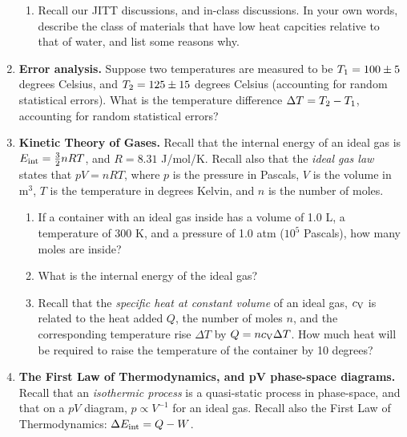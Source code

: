\documentclass[10pt]{article}
\begin{document}
\begin{enumerate}
\begin{enumerate}
\item Recall our JITT discussions, and in-class discussions.  In your own words, describe the class of materials that have low heat capcities relative to that of water, and list some reasons why. \\ \vspace{3cm}
\end{enumerate}
\item \textbf{Error analysis.}  Suppose two temperatures are measured to be $T_{\rm 1} = 100 \pm 5$ degrees Celsius, and $T_{\rm 2} = 125 \pm 15$ degrees Celsius (accounting for random statistical errors).  What is the temperature difference $\Delta T = T_{\rm 2} - T_{\rm 1}$, accounting for random statistical errors? \\ \vspace{2cm}
\item \textbf{Kinetic Theory of Gases.} Recall that the internal energy of an ideal gas is $E_{\rm int} = \frac{3}{2}n R T$, and $R = 8.31$ J/mol/K.  Recall also that the \textit{ideal gas law} states that $pV = n R T$, where $p$ is the pressure in Pascals, $V$ is the volume in m$^3$, $T$ is the temperature in degrees Kelvin, and $n$ is the number of moles.
\begin{enumerate}
\item If a container with an ideal gas inside has a volume of 1.0 L, a temperature of 300 K, and a pressure of 1.0 atm ($10^5$ Pascals), how many moles are inside? \\ \vspace{2cm}
\item What is the internal energy of the ideal gas? \\ \vspace{2cm}
\item Recall that the \textit{specific heat at constant volume} of an ideal gas, $c_{\rm V}$ is related to the heat added $Q$, the number of moles $n$, and the corresponding temperature rise $\Delta T$ by $Q = n c_{\rm V} \Delta T$.  How much heat will be required to raise the temperature of the container by 10 degrees? \\ \vspace{2cm}
\end{enumerate}
\item \textbf{The First Law of Thermodynamics, and pV phase-space diagrams.}  Recall that an \textit{isothermic process} is a quasi-static process in phase-space, and that on a $pV$ diagram, $p \propto V^{-1}$ for an ideal gas.  Recall also the First Law of Thermodynamics: $\Delta E_{\rm int} = Q - W$.

\end{enumerate}
\end{document}
